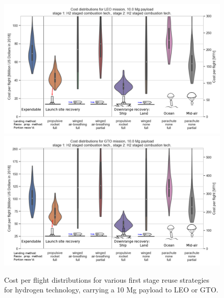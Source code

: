 \documentclass{iaf-iac}
\begin{document}
\begin{multicols}{2}
\begin{figure}
    \centering
    \includegraphics[width=\textwidth]{strategy_cost_annotated/LEO_H2}
     \includegraphics[width=\textwidth]{strategy_cost_annotated/GTO_H2}
    \caption{\label{fig:strategy_cost_H2} Cost per flight distributions for various first stage reuse strategies for hydrogen technology, carrying a 10 Mg payload to LEO or GTO.}
\end{figure}



\end{multicols}
\end{document}
